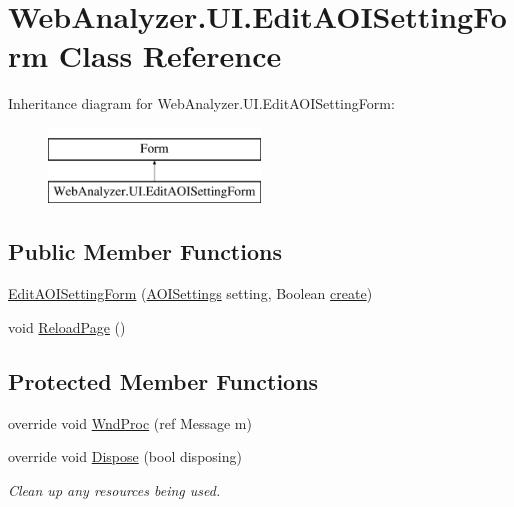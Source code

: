 \hypertarget{class_web_analyzer_1_1_u_i_1_1_edit_a_o_i_setting_form}{}\section{Web\+Analyzer.\+U\+I.\+Edit\+A\+O\+I\+Setting\+Form Class Reference}
\label{class_web_analyzer_1_1_u_i_1_1_edit_a_o_i_setting_form}
Inheritance diagram for Web\+Analyzer.\+U\+I.\+Edit\+A\+O\+I\+Setting\+Form\+:\begin{figure}[H]
\begin{center}
\leavevmode
\includegraphics[height=2.000000cm]{class_web_analyzer_1_1_u_i_1_1_edit_a_o_i_setting_form}
\end{center}
\end{figure}
\subsection*{Public Member Functions}
\begin{DoxyCompactItemize}
\item 
\hyperlink{class_web_analyzer_1_1_u_i_1_1_edit_a_o_i_setting_form_abd1be33a9bb08df8876f4c6058ccfda6}{Edit\+A\+O\+I\+Setting\+Form} (\hyperlink{class_web_analyzer_1_1_models_1_1_settings_model_1_1_a_o_i_settings}{A\+O\+I\+Settings} setting, Boolean \hyperlink{_u_i_2_h_t_m_l_resources_2js_2lib_2underscore_8min_8js_a8bd5981157799459d39a59e8c4a0de04}{create})
\item 
void \hyperlink{class_web_analyzer_1_1_u_i_1_1_edit_a_o_i_setting_form_a292d49b250e34569220541736df0659c}{Reload\+Page} ()
\end{DoxyCompactItemize}
\subsection*{Protected Member Functions}
\begin{DoxyCompactItemize}
\item 
override void \hyperlink{class_web_analyzer_1_1_u_i_1_1_edit_a_o_i_setting_form_ac3f025da2408c167bf806f47caaebb4b}{Wnd\+Proc} (ref Message m)
\item 
override void \hyperlink{class_web_analyzer_1_1_u_i_1_1_edit_a_o_i_setting_form_a082405816f59a1c2f6ece128a29dd3eb}{Dispose} (bool disposing)
\begin{DoxyCompactList}\small\item\em Clean up any resources being used. \end{DoxyCompactList}\end{DoxyCompactItemize}
